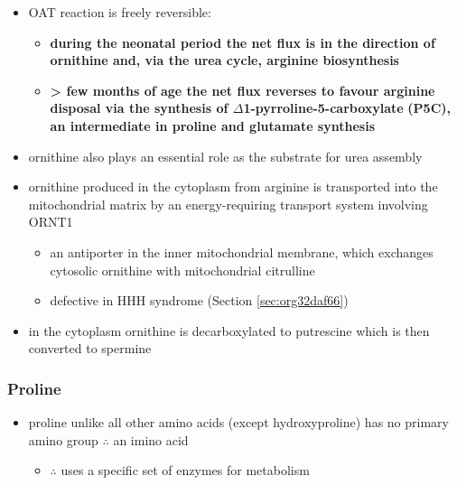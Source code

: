 \documentclass[12pt]{scrartcl}
\begin{document}
\begin{center}
\begin{center}
\begin{itemize}
\item OAT reaction is freely reversible:
\begin{itemize}
\item \textbf{during the neonatal period the net flux is in the direction of}
\textbf{ornithine and, via the urea cycle, arginine biosynthesis}
\item \textbf{\textgreater{} few months of age the net flux reverses to favour arginine}
\textbf{disposal via the synthesis of \(\Delta\)1-pyrroline-5-carboxylate}
\textbf{(P5C), an intermediate in proline and glutamate synthesis}
\end{itemize}
\item ornithine also plays an essential role as the substrate for urea assembly
\item ornithine produced in the cytoplasm from arginine is transported
into the mitochondrial matrix by an energy-requiring transport
system involving ORNT1
\begin{itemize}
\item an antiporter in the inner mitochondrial membrane, which exchanges
cytosolic ornithine with mitochondrial citrulline
\item defective in HHH syndrome (Section \ref{sec:org32daf66})
\end{itemize}
\item in the cytoplasm ornithine is decarboxylated to putrescine which is
then converted to spermine
\end{itemize}

\subsubsection{Proline}
\label{sec:orgf1dce84}
\begin{itemize}
\item proline unlike all other amino acids (except hydroxyproline) has
no primary amino group \(\therefore\) an imino acid
\begin{itemize}
\item \(\therefore\) uses a specific set of enzymes for metabolism
\end{itemize}
\end{itemize}

\begin{center}
\chemnameinit{}
\end{center}


\end{center}
\end{center}
\end{document}
